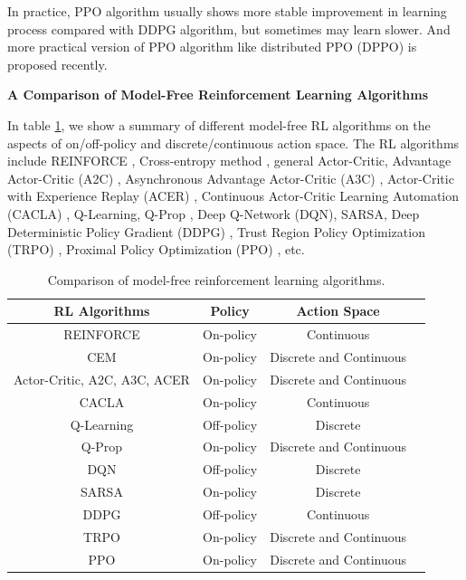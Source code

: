 \documentclass{article}
\begin{document}
In practice, PPO algorithm usually shows more stable improvement in learning process compared with DDPG algorithm, but sometimes may learn slower. And more practical version of PPO algorithm like distributed PPO (DPPO) \cite{heess2017emergence} is proposed recently.

\textbf{A Comparison of Model-Free Reinforcement Learning Algorithms}

In table \ref{table:1}, we show a summary of different model-free RL algorithms on the aspects of on/off-policy and discrete/continuous action space. The RL algorithms include REINFORCE \cite{williams1992simple}, Cross-entropy method \cite{de2005tutorial}, general Actor-Critic, Advantage Actor-Critic (A2C) \cite{mnih2016asynchronous}, Asynchronous Advantage Actor-Critic (A3C) \cite{mnih2016asynchronous}, Actor-Critic with Experience Replay (ACER) \cite{wang2016sample}, Continuous Actor-Critic Learning Automation (CACLA) \cite{van2007reinforcement}, Q-Learning, Q-Prop \cite{gu2016q}, Deep Q-Network (DQN)\cite{mnih2015human}, SARSA, Deep Deterministic Policy Gradient (DDPG) \cite{lillicrap2015continuous}, Trust Region Policy Optimization (TRPO) \cite{schulman2015trust}, Proximal Policy Optimization (PPO) \cite{schulman2017proximal}, etc.

\begin{table}
    \centering
\begin{tabular}{ |c|c|c|c| } 
\hline
RL Algorithms & Policy & Action Space \\
\hline
{REINFORCE} & On-policy & Continuous\\
{CEM} & On-policy & Discrete and Continuous\\
{Actor-Critic, A2C, A3C, ACER}& On-policy & Discrete and Continuous\\
{CACLA}& On-policy & Continuous\\
{Q-Learning} & Off-policy & Discrete \\
{Q-Prop} & On-policy & Discrete and Continuous\\
{DQN} & Off-policy & Discrete \\  
{SARSA}& On-policy & Discrete \\ 
{DDPG} & Off-policy & Continuous\\
{TRPO} & On-policy & Discrete and Continuous\\
{PPO} & On-policy & Discrete and Continuous\\
\hline
\end{tabular}
\caption{Comparison of model-free reinforcement learning algorithms.}
\label{table:1}

\end{table}
\end{document}
